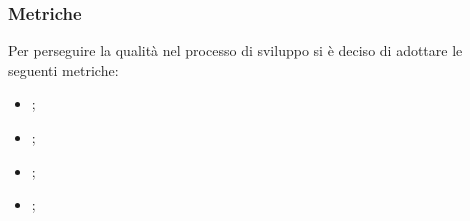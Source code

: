         \subsubsection{Metriche}
        Per perseguire la qualità nel processo di sviluppo si è deciso di adottare le seguenti metriche:
        \begin{itemize}
                \item {};
                \item {};
                \item {};  
                \item {};  
        \end{itemize}






